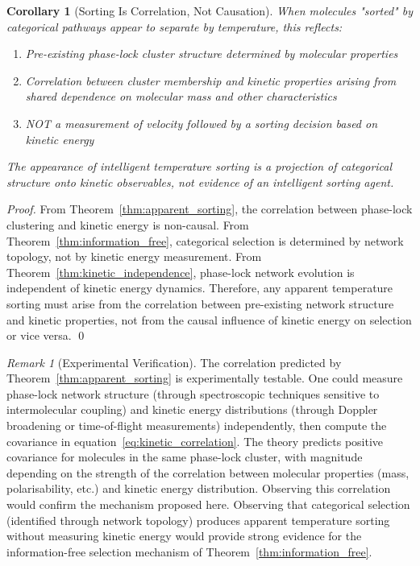 \documentclass[12pt,a4paper]{article}
\newtheorem{corollary}[theorem]{Corollary}
\theoremstyle{definition}
\theoremstyle{remark}
\newtheorem{remark}[theorem]{Remark}
\begin{document}
\begin{corollary}[Sorting Is Correlation, Not Causation]
\label{cor:correlation_not_causation}
When molecules "sorted" by categorical pathways appear to separate by temperature, this reflects:
\begin{enumerate}
    \item Pre-existing phase-lock cluster structure determined by molecular properties
    \item Correlation between cluster membership and kinetic properties arising from shared dependence on molecular mass and other characteristics
    \item NOT a measurement of velocity followed by a sorting decision based on kinetic energy
\end{enumerate}
The appearance of intelligent temperature sorting is a projection of categorical structure onto kinetic observables, not evidence of an intelligent sorting agent.
\end{corollary}

\begin{proof}
From Theorem~\ref{thm:apparent_sorting}, the correlation between phase-lock clustering and kinetic energy is non-causal. From Theorem~\ref{thm:information_free}, categorical selection is determined by network topology, not by kinetic energy measurement. From Theorem~\ref{thm:kinetic_independence}, phase-lock network evolution is independent of kinetic energy dynamics. Therefore, any apparent temperature sorting must arise from the correlation between pre-existing network structure and kinetic properties, not from the causal influence of kinetic energy on selection or vice versa. \qed
\end{proof}

\begin{remark}[Experimental Verification]
\label{rem:experimental_verification}
The correlation predicted by Theorem~\ref{thm:apparent_sorting} is experimentally testable. One could measure phase-lock network structure (through spectroscopic techniques sensitive to intermolecular coupling) and kinetic energy distributions (through Doppler broadening or time-of-flight measurements) independently, then compute the covariance in equation~\eqref{eq:kinetic_correlation}. The theory predicts positive covariance for molecules in the same phase-lock cluster, with magnitude depending on the strength of the correlation between molecular properties (mass, polarisability, etc.) and kinetic energy distribution. Observing this correlation would confirm the mechanism proposed here. Observing that categorical selection (identified through network topology) produces apparent temperature sorting without measuring kinetic energy would provide strong evidence for the information-free selection mechanism of Theorem~\ref{thm:information_free}.
\end{remark}
\end{document}
